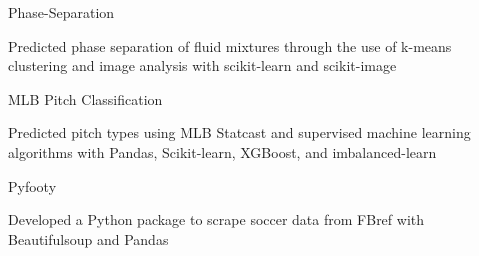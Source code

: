 
\begin{cventries}
  \cventry
    {} %
    {Phase-Separation} %
    {} %
    {} %
    {
      \begin{cvitems} %
        \item {Predicted phase separation of fluid mixtures through the use of
            k-means clustering and image analysis with scikit-learn and
              scikit-image}
      \end{cvitems}
    }

  \cventry
    {} %
    {MLB Pitch Classification} %
    {} %
    {} %
    {
      \begin{cvitems} %
      	\item {Predicted pitch types using
            MLB Statcast and supervised machine learning algorithms with Pandas,
              Scikit-learn, XGBoost, and
              imbalanced-learn}
      \end{cvitems}
    }

  \cventry
    {} %
    {Pyfooty} %
    {} %
    {} %
    {
      \begin{cvitems} %
      	\item {Developed a Python package to scrape soccer data
            from FBref with Beautifulsoup and Pandas}
      \end{cvitems}
    }
\end{cventries}
